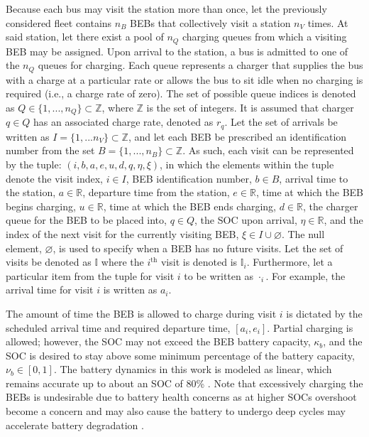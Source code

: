\documentclass[energies,article,submit,moreauthors]{Definitions/mdpi}
\newcommand{\visit}{(i, b, a, e, u, d, q, \eta, \xi)}
\newcommand{\I}{\mathbb{I}}                 %
\newcommand{\Iset}{I}                       %
\begin{document}
Because each bus may visit the station more than once, let the previously considered fleet contains \(n_B\) BEBs that
collectively visit a station \(n_V\) times. At said station, let there exist a pool of \(n_Q\) charging queues from which a
visiting BEB may be assigned. Upon arrival to the station, a bus is admitted to one of the \(n_Q\) queues for charging.
Each queue represents a charger that supplies the bus with a charge at a particular rate or allows the bus to sit idle
when no charging is required (i.e., a charge rate of zero). The set of possible queue indices is denoted as \(Q \in
\{1,...,n_Q\} \subset \mathbb{Z}\), where \(\mathbb{Z}\) is the set of integers. It is assumed that charger \(q \in Q\) has an associated charge rate,
denoted as \(r_q\). Let the set of arrivals be written as \(\Iset = \{ 1, ... n_V \} \subset \mathbb{Z}\), and let each BEB be prescribed
an identification number from the set \(B = \{ 1, ..., n_B \} \subset \mathbb{Z}\). As such, each visit can be represented by the tuple:
\(\visit\), in which the elements within the tuple denote the visit index, \(i \in I\), BEB identification number, \(b \in B\),
arrival time to the station, \(a \in \mathbb{R}\), departure time from the station, \(e \in \mathbb{R}\), time at which the BEB begins charging,
\(u \in \mathbb{R}\), time at which the BEB ends charging, \(d \in \mathbb{R}\), the charger queue for the BEB to be placed into, \(q \in Q\), the SOC
upon arrival, \(\eta \in \mathbb{R}\), and the index of the next visit for the currently visiting BEB, \(\xi \in I \cup \varnothing\). The null
element, \(\varnothing\), is used to specify when a BEB has no future visits. Let the set of visits be denoted as \(\I\)
where the \(i^{\text{th}}\) visit is denoted is \(\I_i\). Furthermore, let a particular item from the tuple for visit \(i\) to
be written as \(\cdot_i\). For example, the arrival time for visit \(i\) is written as \(a_i\).

The amount of time the BEB is allowed to charge during visit \(i\) is dictated by the scheduled arrival time and required
departure time, \([a_i, e_i]\). Partial charging is allowed; however, the SOC may not exceed the BEB battery capacity,
\(\kappa_b\), and the SOC is desired to stay above some minimum percentage of the battery capacity, \(\nu_b \in [0,1]\). The battery
dynamics in this work is modeled as linear, which remains accurate up to about an SOC of 80\%
\cite{liu-2020-batter-elect}. Note that excessively charging the BEBs is undesirable due to battery health concerns as
at higher SOCs overshoot become a concern and may also cause the battery to undergo deep cycles may accelerate battery
degradation \cite{edge-2021-lithium,millner-2010-model-lithium}.
\end{document}
